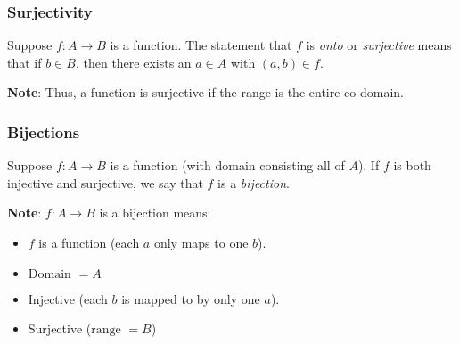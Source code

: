 


        \subsubsection{Surjectivity}

            \begin{definition}
                Suppose $f\colon A \rightarrow B$ is a function. The statement that $f$ is \textit{onto} or \textit{surjective} means that if $b\in B$, then there exists an $a\in A$ with $(a,b)\in f$.
            \end{definition}
            \textbf{Note}: Thus, a function is surjective if the range is the entire co-domain.

        \subsubsection{Bijections}

            \begin{definition}
                Suppose $f\colon A \rightarrow B$ is a function (with domain consisting all of $A$). If $f$ is both injective and surjective, we say that $f$ is a \textit{bijection}.
            \end{definition}
            \textbf{Note}: $f\colon A\rightarrow B$ is a bijection means: 
            \begin{itemize}
                \item $f$ is a function (each $a$ only maps to one $b$).
                \item $\text{Domain } = A$
                \item Injective (each $b$ is mapped to by only one $a$).
                \item Surjective ($\text{range } = B$)
            \end{itemize}

